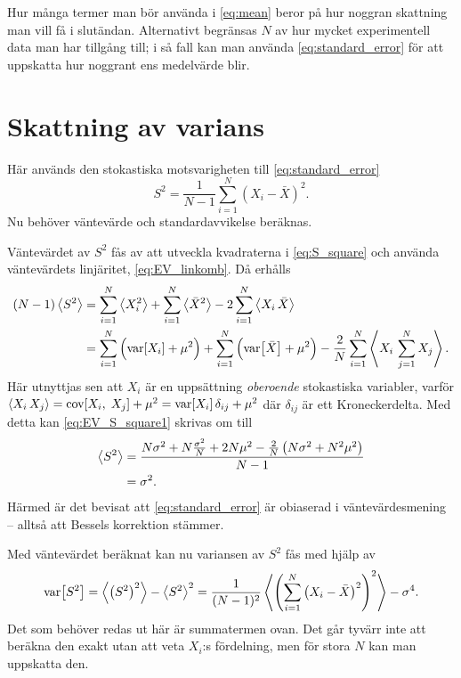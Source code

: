 Hur många termer man bör använda i \eqref{eq:mean} beror på hur noggran skattning man vill få i slutändan. Alternativt begränsas $N$ av hur mycket experimentell data man har tillgång till; i så fall kan man använda \eqref{eq:standard_error} för att uppskatta hur noggrant ens medelvärde blir. 


\section{Skattning av varians}
Här används den stokastiska motsvarigheten till \eqref{eq:standard_error}
\begin{equation}\label{eq:S_square}
S^2 = \frac{1}{N-1} \sum_{i=1}^N \left(X_i-\bar{X} \right)^2.
\end{equation}
Nu behöver väntevärde och standardavvikelse beräknas. 

Väntevärdet av $S^2$ fås av att utveckla kvadraterna i \eqref{eq:S_square} och använda väntevärdets linjäritet, \eqref{eq:EV_linkomb}. Då erhålls
\begin{equation}\label{eq:EV_S_square1}
\begin{aligned}
(N-1)\ev{S^2} &=  \sum_{i=1}^N \ev{X_i^2} 
+ \sum_{i=1}^N\ev{\bar{X}^2} 
- 2\sum_{i=1}^N\ev{X_i\,\bar{X}}\\
&= 
\sum_{i=1}^N \Big( \VAR{X_i}+\mu^2 \Big)
+\sum_{i=1}^N\Big( \VAR{\bar{X}}+\mu^2 \Big)
-\frac{2}{N}\sum_{i=1}^N\ev{X_i\,\sum_{j=1}^N X_j}.
\end{aligned}
\end{equation}
Här utnyttjas sen att $X_i$ är en uppsättning \emph{oberoende} stokastiska variabler, varför $\ev{X_i\,X_j}=\COV{X_i}{X_j}+\mu^2=\VAR{X_i}\delta_{ij}+\mu^2$ där $\delta_{ij}$ är ett Kroneckerdelta. Med detta kan \eqref{eq:EV_S_square1} skrivas om till
\begin{equation}\label{eq:EV_S_square2}
\begin{aligned}
\ev{S^2} &= \frac{
N\sigma^2 + N\frac{\sigma^2}{N} + 2N\mu^2
-\frac{2}{N} \left( N\sigma^2 + N^2\mu^2 \right)
}{N-1} \\
&= \sigma^2.
\end{aligned}
\end{equation}
Härmed är det bevisat att \eqref{eq:standard_error} är obiaserad i väntevärdesmening -- alltså att Bessels korrektion stämmer.


Med väntevärdet beräknat kan nu variansen av $S^2$ fås med hjälp av 
\begin{equation}\label{eq:VAR_S_square}
\VAR{S^2} = \ev{\left(S^2\right)^2} - \ev{S^2}^2
= \frac{1}{(N-1)^2}\ev{\left(\sum_{i=1}^N\left(X_i-\bar{X}\right)^2 \right)^2} - \sigma^4.
\end{equation}
Det som behöver redas ut här är summatermen ovan. 
Det går tyvärr inte att beräkna den exakt utan att veta $X_i$:s fördelning, men för stora $N$ kan man uppskatta den. 

